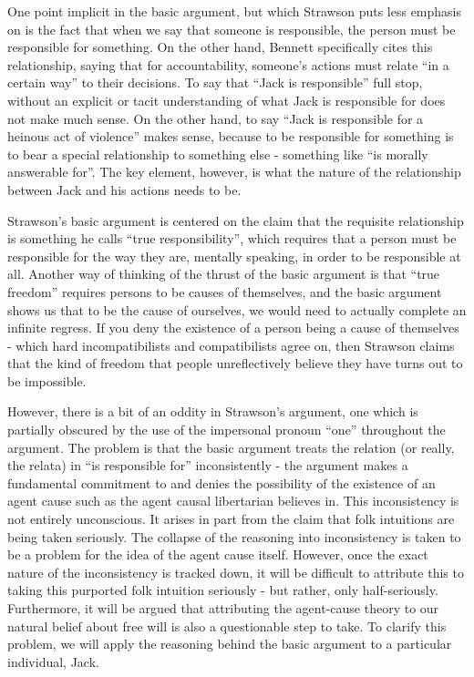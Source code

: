 \documentclass[phd,12pt,oneside,paper=letterpaper]{ubcthesis}
\begin{document}
One point implicit in the basic argument, but which Strawson puts less emphasis on is the fact that when we say that someone is responsible, the person must be responsible for something. On the other hand, Bennett specifically cites this relationship, saying that for accountability, someone's actions must relate ``in a certain way'' to their decisions.  \citep[p.16]{bennett1980} To say that ``Jack is responsible'' full stop, without an explicit or tacit understanding of what Jack is responsible for does not make much sense. On the other hand, to say ``Jack is responsible for a heinous act of violence'' makes sense, because to be responsible for something is to bear a special relationship to something else - something like ``is morally answerable for''. The key element, however, is what the nature of the relationship between Jack and his actions needs to be. 

Strawson's basic argument is centered on the claim that the requisite relationship is something he calls ``true responsibility'', which requires that a person must be responsible for the way they are, mentally speaking, in order to be responsible at all. Another way of thinking of the thrust of the basic argument is that ``true freedom'' requires persons to be causes of themselves, and the basic argument shows us that to be the cause of ourselves, we would need to actually complete an infinite regress. If you deny the existence of a person being a cause of themselves - which hard incompatibilists and compatibilists agree on, then Strawson claims that the kind of freedom that people unreflectively believe they have turns out to be impossible.  

However, there is a bit of an oddity in Strawson's argument, one which is partially obscured by the use of the impersonal pronoun ``one'' throughout the argument. The problem is that the basic argument treats the relation (or really, the relata) in ``is responsible for'' inconsistently - the argument makes a fundamental commitment to and denies the possibility of the existence of an agent cause such as the agent causal libertarian believes in. This inconsistency is not entirely unconscious. It arises in part from the claim that folk intuitions are being taken seriously. The collapse of the reasoning into inconsistency is taken to be a problem for the idea of the agent cause itself. However, once the exact nature of the inconsistency is tracked down, it will be difficult to attribute this to taking this purported folk intuition seriously - but rather, only half-seriously. Furthermore, it will be argued that attributing the agent-cause theory to our natural belief about free will is also a questionable step to take. To clarify this problem, we will apply the reasoning behind the basic argument to a particular individual, Jack.
\end{document}
